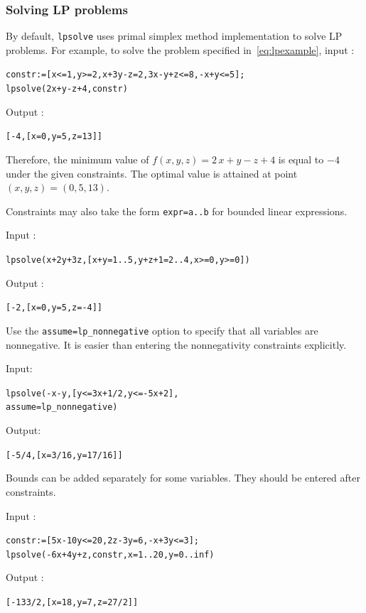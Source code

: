 \documentclass[a4paper,11pt]{book}
\begin{document}
\subsubsection{Solving LP problems}
By default, {\tt lpsolve} uses primal simplex method implementation to solve LP problems. For example, to solve the problem specified in~\eqref{eq:lpexample}, input :
\begin{center}
{\tt constr:=[x<=1,y>=2,x+3y-z=2,3x-y+z<=8,-x+y<=5];}\\
{\tt lpsolve(2x+y-z+4,constr)}
\end{center}
Output :
\begin{center}
\tt [-4,[x=0,y=5,z=13]]
\end{center}
Therefore, the minimum value of $ f(x,y,z)=2\,x+y-z+4 $ is equal to $ -4 $ under the given constraints. The optimal value is attained at point $ (x,y,z)=(0,5,13) $.

Constraints may also take the form {\tt expr=a..b} for bounded linear expressions.

\noindent Input :
\begin{center}
{\tt lpsolve(x+2y+3z,[x+y=1..5,y+z+1=2..4,x>=0,y>=0])}
\end{center}
Output :
\begin{center}
{\tt [-2,[x=0,y=5,z=-4]]}
\end{center}

Use the {\tt assume=lp\_nonnegative} option to specify that all variables are nonnegative. It is easier than entering the nonnegativity constraints explicitly.

\noindent Input:
\begin{center}
{\tt lpsolve(-x-y,[y<=3x+1/2,y<=-5x+2],}\\
{\tt assume=lp\_nonnegative)}
\end{center}
Output:
\begin{center}
{\tt [-5/4,[x=3/16,y=17/16]]}
\end{center}

Bounds can be added separately for some variables. They should be entered after constraints.

\noindent Input :
\begin{center}
{\tt constr:=[5x-10y<=20,2z-3y=6,-x+3y<=3];}\\
{\tt lpsolve(-6x+4y+z,constr,x=1..20,y=0..inf)}
\end{center}
Output :
\begin{center}
{\tt [-133/2,[x=18,y=7,z=27/2]]}
\end{center}
\end{document}
